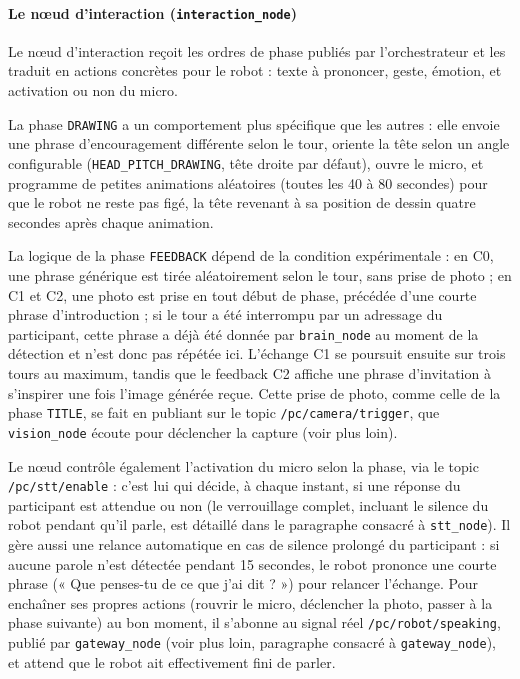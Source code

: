 \documentclass[11pt]{article}
\begin{document}
\paragraph{Le nœud d'interaction (\texttt{interaction\_node})}

Le nœud d'interaction reçoit les ordres de phase publiés par l'orchestrateur et les traduit en actions concrètes pour le robot : texte à prononcer, geste, émotion, et activation ou non du micro.

La phase \texttt{DRAWING} a un comportement plus spécifique que les autres : elle envoie une phrase d'encouragement différente selon le tour, oriente la tête selon un angle configurable (\texttt{HEAD\_PITCH\_DRAWING}, tête droite par défaut), ouvre le micro, et programme de petites animations aléatoires (toutes les 40 à 80 secondes) pour que le robot ne reste pas figé, la tête revenant à sa position de dessin quatre secondes après chaque animation.

La logique de la phase \texttt{FEEDBACK} dépend de la condition expérimentale : en C0, une phrase générique est tirée aléatoirement selon le tour, sans prise de photo ; en C1 et C2, une photo est prise en tout début de phase, précédée d'une courte phrase d'introduction ; si le tour a été interrompu par un adressage du participant, cette phrase a déjà été donnée par \texttt{brain\_node} au moment de la détection et n'est donc pas répétée ici. L'échange C1 se poursuit ensuite sur trois tours au maximum, tandis que le feedback C2 affiche une phrase d'invitation à s'inspirer une fois l'image générée reçue. Cette prise de photo, comme celle de la phase \texttt{TITLE}, se fait en publiant sur le topic \texttt{/pc/camera/trigger}, que \texttt{vision\_node} écoute pour déclencher la capture (voir plus loin). 

Le nœud contrôle également l'activation du micro selon la phase, via le topic \texttt{/pc/stt/enable} : c'est lui qui décide, à chaque instant, si une réponse du participant est attendue ou non (le verrouillage complet, incluant le silence du robot pendant qu'il parle, est détaillé dans le paragraphe consacré à \texttt{stt\_node}). Il gère aussi une relance automatique en cas de silence prolongé du participant : si aucune parole n'est détectée pendant 15 secondes, le robot prononce une courte phrase (« Que penses-tu de ce que j'ai dit ? ») pour relancer l'échange. Pour enchaîner ses propres actions (rouvrir le micro, déclencher la photo, passer à la phase suivante) au bon moment, il s'abonne au signal réel \texttt{/pc/robot/speaking}, publié par \texttt{gateway\_node} (voir plus loin, paragraphe consacré à \texttt{gateway\_node}), et attend que le robot ait effectivement fini de parler.
\end{document}
